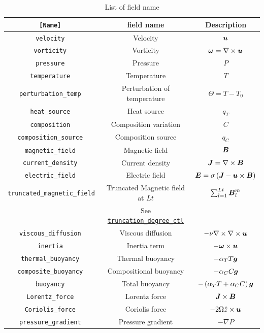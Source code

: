 \begin{table}[htp]
\caption{List of field name}
\begin{center}
\begin{tabular}{|c|c|c|}
\hline
\tt [Name] & field name & Description \\ \hline \hline
\tt velocity &    Velocity &  $\mbox{\boldmath$u$}$ \\
\tt vorticity &   Vorticity & $\mbox{\boldmath$\omega$} = \nabla \times \mbox{\boldmath$u$} $ \\
\tt pressure &    Pressure & $P$ \\
\hline
\tt temperature & Temperature & $T$ \\
\tt perturbation\_temp & Perturbation of temperature
& $\Theta = T - T_{0}$ \\
\tt heat\_source & Heat source
& $q_{T}$ \\
\hline
\tt composition & Composition variation & $C$ \\
\tt composition\_source & Composition source & $q_{C}$ \\
\hline
\tt magnetic\_field &  Magnetic field  & $\mbox{\boldmath$B$}$ \\
\tt current\_density & Current density & $\mbox{\boldmath$J$} = \nabla \times \mbox{\boldmath$B$} $ \\
\tt electric\_field & Electric field & $\mbox{\boldmath$E$} = \sigma \left(\mbox{\boldmath$J$} - \mbox{\boldmath$u$} \times \mbox{\boldmath$B$}\right) $ \\
\tt truncated\_magnetic\_field & Truncated Magnetic field at $Lt$ & $\sum_{l=1}^{Lt} \mbox{\boldmath$B$}_{l}^{m}$ \\
 &  See \hyperref[href_t:crustal_filtering_ctl]{\tt truncation\_degree\_ctl} &  \\
\hline \hline
\tt viscous\_diffusion & Viscous diffusion
& $-\nu \nabla \times \nabla \times \mbox{\boldmath$u$}$ \\
\tt inertia & Inertia term &  $ -\mbox{\boldmath$\omega$} \times \mbox{\boldmath$u$} $ \\
\tt thermal\_buoyancy & Thermal buoyancy &  $ -\alpha_{T} T \mbox{\boldmath$g$}  $ \\
\tt composite\_buoyancy & Compositional buoyancy &  $ -\alpha_{C} C \mbox{\boldmath$g$}  $\\
\tt buoyancy & Total buoyancy &  $ -\left(\alpha_{T} T + \alpha_{C} C \right) \mbox{\boldmath$g$}  $ \\
\tt Lorentz\_force & Lorentz force &  $ \mbox{\boldmath$J$} \times \mbox{\boldmath$B$} $ \\
\tt Coriolis\_force & Coriolis force &  $ -2 \Omega \hat{z} \times \mbox{\boldmath$u$} $ \\
\tt pressure\_gradient & Pressure gradient &  $  - \nabla P  $ \\

\end{tabular}
\end{center}
\end{table}

